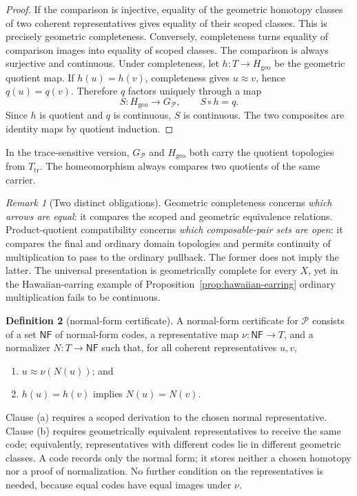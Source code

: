 \documentclass[10pt,reqno]{amsart}
\theoremstyle{definition}
\newtheorem{definition}{Definition}[section]
\theoremstyle{plain}
\theoremstyle{remark}
\newtheorem{remark}[definition]{Remark}
\begin{document}
\begin{proof}
If the comparison is injective, equality of the geometric homotopy classes
of two coherent representatives gives equality of their scoped classes.
This is precisely geometric completeness.  Conversely, completeness turns equality of comparison images
into equality of scoped classes.  The comparison is always surjective and
continuous.  Under completeness, let
$h:T\to H_{\mathrm{geo}}$ be the geometric quotient map.  If
$h(u)=h(v)$, completeness gives $u\approx v$, hence $q(u)=q(v)$.  Therefore
$q$ factors uniquely through a map
\[
  S:H_{\mathrm{geo}}\longrightarrow G_{\mathcal P},
  \qquad S\circ h=q.
\]
Since $h$ is quotient and $q$ is continuous, $S$ is continuous.  The two
composites are identity maps by quotient induction.
\end{proof}

In the trace-sensitive version, $G_{\mathcal P}$ and $H_{\mathrm{geo}}$ both
carry the quotient topologies from $T_{\mathrm{tr}}$.  The homeomorphism always
compares two quotients of the same carrier.

\begin{remark}[Two distinct obligations]
Geometric completeness concerns \emph{which arrows are equal}:
it compares the scoped and geometric equivalence relations.
Product-quotient compatibility concerns \emph{which composable-pair sets
are open}: it compares the final and ordinary domain topologies and permits
continuity of multiplication to pass to the ordinary pullback.
The former does not imply the latter.  The universal presentation is
geometrically complete for every $X$, yet in the Hawaiian-earring example of
Proposition~\ref{prop:hawaiian-earring} ordinary multiplication fails to be
continuous.
\end{remark}

\begin{definition}[normal-form certificate]
A normal-form certificate for $\mathcal P$ consists of a set
$\mathsf{NF}$ of normal-form codes, a representative map
$\nu:\mathsf{NF}\to T$, and a normalizer $N:T\to\mathsf{NF}$ such that,
for all coherent representatives $u,v$,
\begin{enumerate}[label=(\alph*),leftmargin=2.2em]
\item $u\approx\nu(N(u))$; and
\item $h(u)=h(v)$ implies $N(u)=N(v)$.
\end{enumerate}

Clause (a) requires a scoped derivation to the chosen normal representative.
Clause (b) requires geometrically equivalent representatives to receive the
same code; equivalently, representatives with different codes lie in
different geometric classes.
A code records only the normal form; it stores neither a chosen homotopy nor
a proof of normalization.  No further condition on the representatives is
needed, because equal codes have equal images under $\nu$.

\end{definition}
\end{document}
